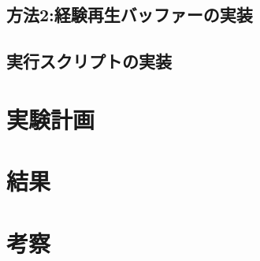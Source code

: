 \documentclass[a4paper,11pt]{jsarticle}
\begin{document}


\subsection{方法2:経験再生バッファーの実装}

\subsection{実行スクリプトの実装}





\section{実験計画}


\section{結果}

\section{考察}
\end{document}

